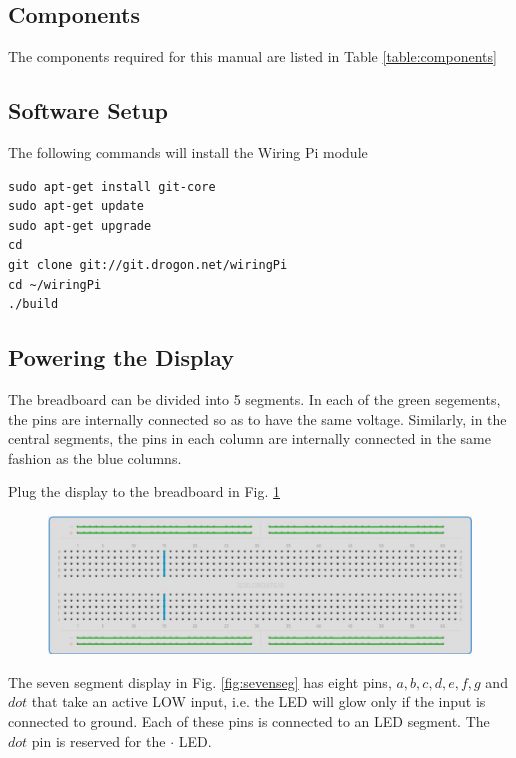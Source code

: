 \subsection{Components}
The components required for this manual are listed in Table \ref{table:components}

\subsection{Software Setup}
The following commands will install the Wiring Pi module
\begin{lstlisting}
sudo apt-get install git-core
sudo apt-get update
sudo apt-get upgrade
cd
git clone git://git.drogon.net/wiringPi
cd ~/wiringPi
./build
\end{lstlisting}
\subsection{Powering the Display}
The breadboard can be divided into 5 segments.  In each of the green segements, the pins are internally connected so as to have the same voltage.  Similarly, in the central segments, the pins in each column  are internally connected in the same fashion as the blue columns. 

\begin{problem}
	Plug the display to the breadboard in Fig. \ref{fig:breadboard}
\end{problem}
\begin{figure}[!h]
\begin{center}
\includegraphics[width=\columnwidth]{./figs/breadboard}
\end{center}
\caption{}
\label{fig:breadboard}
\end{figure}

The seven segment display in Fig. \ref{fig:sevenseg} has eight pins, $a, b, c, d, e, f, g$ and $dot$ that take an active LOW input, i.e.  the LED will glow only if the input is connected to ground.  Each of these pins is connected to an LED segment.  The $dot$ pin is  reserved for the $\cdot$ LED.  

